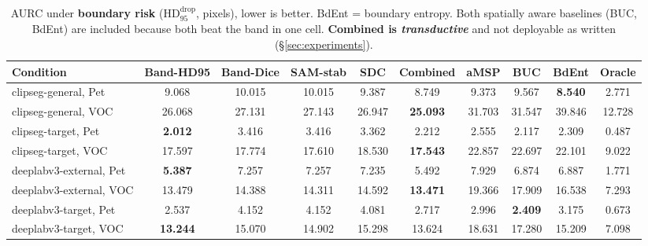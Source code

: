 \documentclass[11pt]{article}
\theoremstyle{remark}
\newcommand{\HDF}{\mathrm{HD}_{95}}
\begin{document}
\begin{table}[t]
\centering
\small
\caption{AURC under \textbf{boundary risk} ($\HDF^{\mathrm{drop}}$, pixels), lower
is better. BdEnt = boundary entropy. Both spatially aware baselines (BUC, BdEnt) are
included because both beat the band in one cell. \textbf{Combined is
\emph{transductive}} and not deployable as written (\S\ref{sec:experiments}).}
\label{tab:boundary}
\begin{tabular}{lccccccccc}
\toprule
Condition & Band-HD95 & Band-Dice & SAM-stab & SDC & Combined & aMSP & BUC & BdEnt & Oracle \\
\midrule
clipseg-general, Pet     & 9.068 & 10.015 & 10.015 & 9.387 & 8.749 & 9.373 & 9.567 & \textbf{8.540} & 2.771 \\
clipseg-general, VOC     & 26.068 & 27.131 & 27.143 & 26.947 & \textbf{25.093} & 31.703 & 31.547 & 39.846 & 12.728 \\
clipseg-target, Pet      & \textbf{2.012} & 3.416 & 3.416 & 3.362 & 2.212 & 2.555 & 2.117 & 2.309 & 0.487 \\
clipseg-target, VOC      & 17.597 & 17.774 & 17.610 & 18.530 & \textbf{17.543} & 22.857 & 22.697 & 22.101 & 9.022 \\
deeplabv3-external, Pet  & \textbf{5.387} & 7.257 & 7.257 & 7.235 & 5.492 & 7.929 & 6.874 & 6.887 & 1.771 \\
deeplabv3-external, VOC  & 13.479 & 14.388 & 14.311 & 14.592 & \textbf{13.471} & 19.366 & 17.909 & 16.538 & 7.293 \\
deeplabv3-target, Pet    & 2.537 & 4.152 & 4.152 & 4.081 & 2.717 & 2.996 & \textbf{2.409} & 3.175 & 0.673 \\
deeplabv3-target, VOC    & \textbf{13.244} & 15.070 & 14.902 & 15.298 & 13.624 & 18.631 & 17.280 & 15.209 & 7.098 \\
\bottomrule
\end{tabular}
\end{table}
\end{document}
